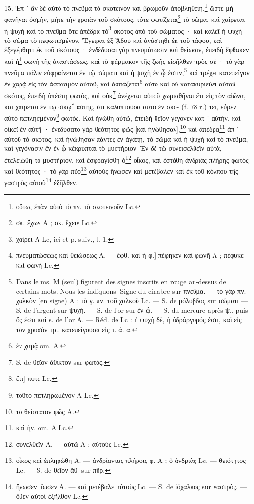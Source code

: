 \documentclass[a4paper, 11pt, oneside, polutonikogreek, french]{article}
\begin{document}
15. Ἐπ ᾽ ἂν δὲ αὐτὸ τὸ πνεῦμα τὸ σκοτεινὸν καὶ βρωμοῦν ἀποβληθείη,\footnote{οὕτω, ἐπὰν αὐτὸ τὸ πν. τὸ σκοτεινοῦν Lc.} ὥστε μὴ φανῆναι ὀσμὴν, μήτε τὴν χροιὰν τοῦ σκότους, τότε φωτίζεται\footnote{σκ. ἔχων A ; σκ. ἔχειν Lc.} τὸ σῶμα, καὶ χαίρεται ἡ ψυχὴ καὶ τὸ πνεῦμα ὅτε ἀπέδρα τὸ\footnote{χαίρει A Lc, ici et p. suiv., l. 1.} σκότος ἀπὸ τοῦ σώματος · καὶ καλεῖ ἡ ψυχὴ τὸ σῶμα τὸ πεφωτισμένον. Ἔγειραι ἐξ ᾍδου καὶ ἀνάστηθι ἐκ τοῦ τάφου, καὶ ἐξεγέρθητι ἐκ τοῦ σκότους · ἐνδέδυσαι γὰρ πνευμάτωσιν καὶ θείωσιν, ἐπειδὴ ἔφθακεν καὶ ἡ\footnote{πνευματώσεως καὶ θειώσεως A. --- ἔφθ. καὶ ἡ φ.] πέφηκεν καὶ φωνῆ A ; πέφυκε κaὶ φωνὴ Lc.} φωνὴ τῆς ἀναστάσεως, καὶ τὸ φάρμακον τῆς ζωῆς εἰσῆλθεν πρὸς σέ · τὸ γὰρ πνεῦμα πάλιν εὐφραίνεται ἐν τῷ σώματι καὶ ἡ ψυχὴ ἐν ᾧ ἐστιν,\footnote{Dans le ms. M (seul) figurent des signes inscrits en rouge au-dessus de certains mots. Nous les indiquons. Signe du cinabre sur πνεῦμα. --- τὸ γὰρ πν. χαλκὸν (en signe) A ; τὸ γ. πν. τοῦ χαλκοῦ Lc. --- S. de μόλυβδος sur σώματι --- S. de l'argent sur ψυχὴ. --- S. de l'or sur ἐν ᾧ. --- S. du mercure après ψ., puis ὅς ἐστι καὶ s. de l'or A. --- Réd. de Lc : ἡ ψυχὴ δὲ, ἡ ὑδράργυρός ἐστι, καὶ εἰς τὸν χρυσὸν τρ., κατεπείγουσα εἰς τ. ἀ. α.} καὶ τρέχει κατεπεῖγον ἐν χαρᾷ εἰς τὸν ἀσπασμὸν αὐτοῦ, καὶ ἀσπάζεται\footnote{ἐν χαρᾷ om. A.} αὐτὸ καὶ οὐ κατακυριεύει αὐτοῦ σκότος, ἐπειδὴ ὑπέστη φωτὸς, καὶ οὐκ\footnote{S. de θεῖον ἄθικτον sur φωτὸς.} ἀνέχεται αὐτοῦ χωρισθῆναι ἔτι εἰς τὸν αἰῶνα, καὶ χαίρεται ἐν τῷ οἴκῳ\footnote{ἔτι] ποτε Lc.} αὐτῆς, ὅτι καλύπτουσα αὐτὸ ἐν σκό- (f. 78 r.) τει, εὗρεν αὐτὸ πεπλησμένον\footnote{τοῦτο πεπληρωμένον A Lc.} φωτός. Καὶ ἡνώθη αὐτῷ, ἐπειδὴ θεῖον γέγονεν κατ ᾽ αὐτὴν, καὶ οἰκεῖ ἐν αὐτῇ · ἐνεδύσατο γὰρ θεότητος φῶς [καὶ ἡνώθησαν],\footnote{τὸ θείοτατον φῶς A.} καὶ ἀπέδρα\footnote{καὶ ἡν. om. A Lc.} ἀπ ᾽ αὐτοῦ τὸ σκότος, καὶ ἡνώθησαν πάντες ἐν ἀγάπῃ, τὸ σῶμα καὶ ἡ ψυχὴ καὶ τὸ πνεῦμα, καὶ γεγόνασιν ἓν ἐν ᾧ κέκρυπται τὸ μυστήριον. Ἐν δὲ τῷ συνεισελθεῖν αὐτὰ, ἐτελειώθη τὸ μυστήριον, καὶ ἐσφραγίσθη ὁ\footnote{συνελθεῖν A. --- αὐτῶ A ; αὐτοὺς Lc.} οἶκος, καὶ ἐστάθη ἀνδριὰς πλήρης φωτὸς καὶ θεότητος · τὸ γὰρ πῦρ\footnote{οἶκος καὶ ἐπληρώθη A. --- ἀνδρίαντας πλήροις φ. A ; ὁ ἀνδριὰς Lc. --- θειότητος Lc. --- S. de θεῖον ἄθ. sur πῦρ.} αὐτοὺς ἥνωσεν καὶ μετέβαλεν καὶ ἐκ τοῦ κόλπου τῆς γαστρὸς αὐτοῦ\footnote{ἥνωσεν] ἴωσεν A. --- καὶ μετέβαλε αὐτοὺς Lc. --- S. de ἰόχαλκος sur γαστρὸς. --- ὅθεν αὐτοὶ ἐξῆλθον Lc.} ἐξῆλθεν.
\end{document}
